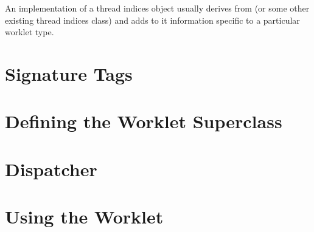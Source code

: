 An implementation of a thread indices object usually derives from  (or some other existing thread indices class) and adds to it information specific to a particular worklet type.



\section{Signature Tags}
\label{sec:NewWorkletTypes:SignatureTags}

\section{Defining the Worklet Superclass}
\label{sec:NewWorkletTypes:WorkletSuperclass}
\label{sec:WorkletSuperclass}

\section{Dispatcher}
\label{sec:NewWorkletTypes:Dispatcher}



\section{Using the Worklet}
\label{sec:NewWorkletTypes:Using}



